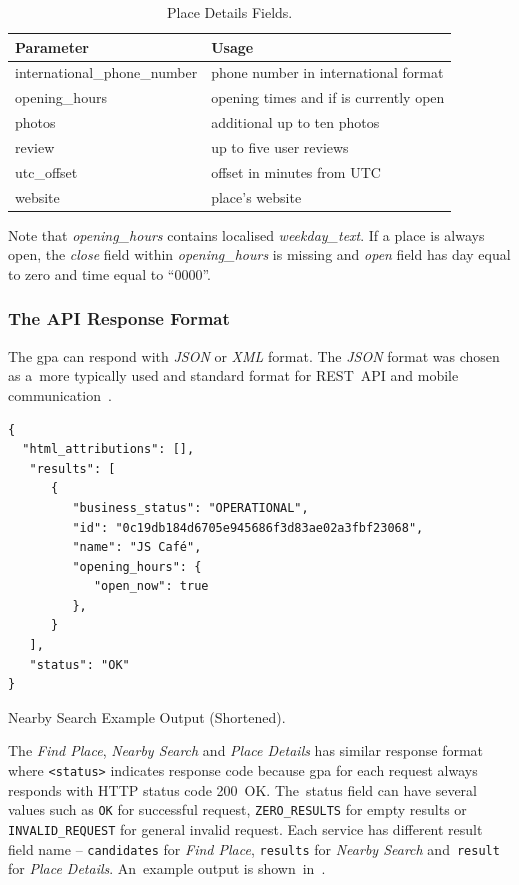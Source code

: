 \begin{table}[htbp]
\centering
\begin{tabularx}{\textwidth}{|l|X|}
\hline
\textbf{Parameter} & \textbf{Usage} \\ \hline
international\_phone\_number           & phone number in international format \\ \hline
opening\_hours           & opening times and if is currently open \\ \hline
photos                & additional up to ten photos \\ \hline
review           & up to five user reviews \\ \hline
utc\_offset           &  offset in minutes from UTC \\ \hline
website           & place's website \\ \hline
\end{tabularx}
\caption{Place Details Fields.}
\label{table:gapi-details-fields}
\end{table}

Note that \textit{opening\_hours} contains localised \textit{weekday\_text}. If a place is always open, the \textit{close} field within \textit{opening\_hours} is missing and \textit{open} field has day equal to zero and time equal to ``0000''.
\subsubsection{The API Response Format}
The \gls{gpa} can respond with \textit{JSON} or \textit{XML} format. The \textit{JSON} format was chosen as a~more typically used and standard format for REST~API and mobile communication~\cite{xml-vs-json}. 

\begin{listing}[h!]
\begin{verbatim}
{
  "html_attributions": [],
   "results": [      
      {
         "business_status": "OPERATIONAL",
         "id": "0c19db184d6705e945686f3d83ae02a3fbf23068",
         "name": "JS Café",
         "opening_hours": {
            "open_now": true
         },
      }
   ],
   "status": "OK"
}
\end{verbatim}
\caption{Nearby Search Example Output (Shortened).}
\label{listing:gapi-example-response}
\end{listing}

The \textit{Find Place}, \textit{Nearby Search} and \textit{Place Details} has similar response format where \verb|<status>| indicates response code because \gls{gpa} for each request always responds with HTTP status code 200~OK. The~status field can have several values such as \verb|OK| for successful request, \verb|ZERO_RESULTS| for empty results or \verb|INVALID_REQUEST| for general invalid request. Each service has different result field name -- \verb|candidates| for \textit{Find Place}, \verb|results| for \textit{Nearby Search} and~\verb|result| for \textit{Place Details}. An~example output is shown~in~.
